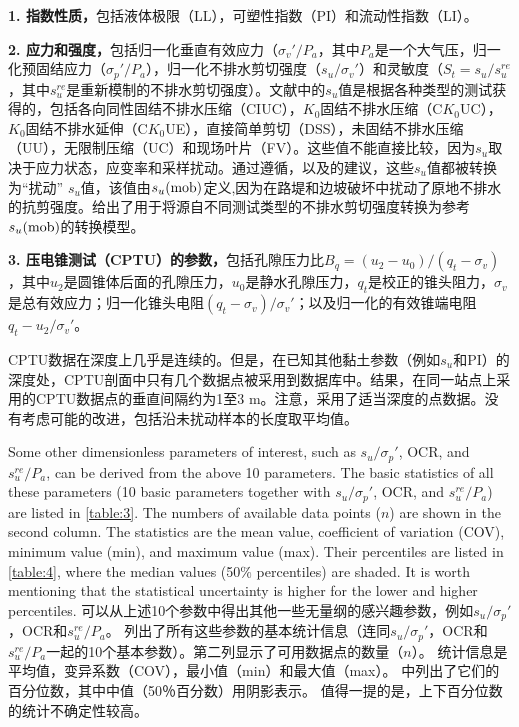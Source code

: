\begin{Parallel}{0.60\textwidth}{}
{        \textbf{1. 指数性质，}包括液体极限（LL），可塑性指数（PI）和流动性指数（LI）。

        \textbf{2. 应力和强度，}包括归一化垂直有效应力（$\sigma_v'/P_a$，其中$P_a$是一个大气压，归一化预固结应力（$\sigma_p'/P_a$），归一化不排水剪切强度（$s_u/\sigma_v'$）和灵敏度（$S_t=s_u/s_u^{re}$，其中$s_u^{re}$是重新模制的不排水剪切强度）。文献中的$s_u$值是根据各种类型的测试获得的，包括各向同性固结不排水压缩（CIUC），$K_0$固结不排水压缩（C$K_0$UC），$K_0$固结不排水延伸（C$K_0$UE），直接简单剪切（DSS），未固结不排水压缩（UU），无限制压缩（UC）和现场叶片（FV）。这些值不能直接比较，因为$s_u$取决于应力状态，应变率和采样扰动。通过遵循\citet{Bjerrum19721}，\citet{Kulhawy1990}以及\citet{Mesri20071}的建议，这些$s_u$值都被转换为“扰动” $s_u$值，该值由$s_u(\rm{mob})$定义,因为在路堤和边坡破坏中扰动了原地不排水的抗剪强度\citep{Mesri20071}。给出了用于将源自不同测试类型的不排水剪切强度转换为参考$s_u(\rm{mob})$的转换模型。

        \textbf{3. 压电锥测试（CPTU）的参数，}包括孔隙压力比$B_q=(u_2-u_0)/(q_t-\sigma_v)$，其中$u_2$是圆锥体后面的孔隙压力，$u_0$是静水孔隙压力，$q_t$是校正的锥头阻力，$\sigma_v$是总有效应力；归一化锥头电阻$(q_t-\sigma_v)/\sigma_v'$；以及归一化的有效锥端电阻$q_t-u_2/\sigma_v'$。\par
        CPTU数据在深度上几乎是连续的。但是，在已知其他黏土参数（例如$s_u$和PI）的深度处，CPTU剖面中只有几个数据点被采用到数据库中。结果，在同一站点上采用的CPTU数据点的垂直间隔约为1至3 m。注意，采用了适当深度的点数据。没有考虑可能的改进，包括沿未扰动样本的长度取平均值。
    }
    \ParallelPar
    
    \ParallelLText
    {
        Some other dimensionless parameters of interest, such as $s_u/\sigma_p'$, OCR, and $s_u^{re}/P_a$, can be derived from the above 10 parameters. The basic statistics of all these parameters (10 basic parameters together with $s_u/\sigma_p'$, OCR, and $s_u^{re}/P_a$) are listed in \autoref{table:3}. The numbers of available data points ($n$) are shown in the second column. The statistics are the mean value, coefficient of variation (COV), minimum value (min), and maximum value (max). Their percentiles are listed in \autoref{table:4}, where the median values (50$\%$ percentiles) are shaded. It is worth mentioning that the statistical uncertainty is higher for the lower and higher percentiles.
    }
    \ParallelRText
    {
        可以从上述10个参数中得出其他一些无量纲的感兴趣参数，例如$s_u/\sigma_p'$，OCR和$s_u^{re}/P_a$。 列出了所有这些参数的基本统计信息（连同$s_u/\sigma_p'$，OCR和$s_u^{re}/P_a$一起的10个基本参数）。第二列显示了可用数据点的数量（$n$）。 统计信息是平均值，变异系数（COV），最小值（min）和最大值（max）。 中列出了它们的百分位数，其中中值（50％百分数）用阴影表示。 值得一提的是，上下百分位数的统计不确定性较高。
    }
    \ParallelPar
    
\end{Parallel}
